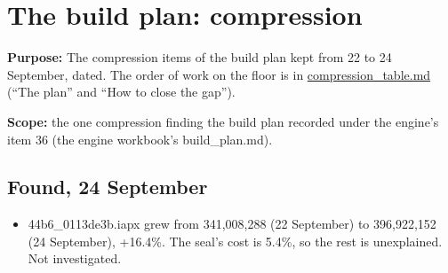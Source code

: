 \chapter{\texorpdfstring{The build plan: compression}{The build plan: compression}}
\label{chap:build-plan}

\textbf{Purpose:} The compression items of the build plan kept from 22 to 24 September, dated. The order of work on the floor is in \hyperref[chap:compression-table]{compression\_\allowbreak{}table.md} (“The plan” and “How to close the gap”).

\textbf{Scope:} the one compression finding the build plan recorded under the engine's item 36 (the engine workbook's build\_\allowbreak{}plan.md).

\section{\texorpdfstring{Found, 24 September}{Found, 24 September}}

\begin{itemize}
\item 44b6\_\allowbreak{}0113de3b.iapx grew from 341,008,288 (22 September) to 396,922,152 (24 September), +16.4\%. The seal's cost is 5.4\%, so the rest is unexplained. Not investigated.
\end{itemize}
